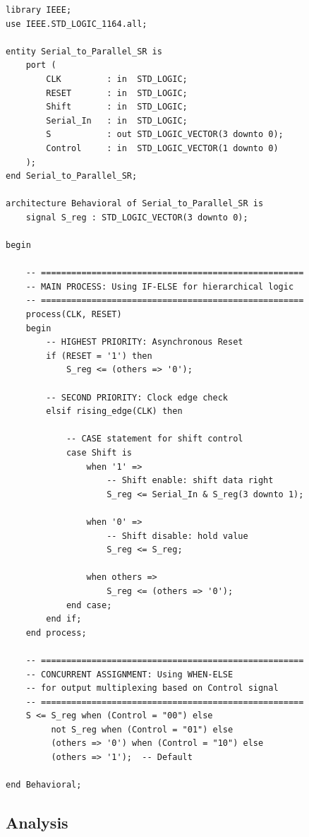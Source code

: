 \documentclass[12pt,a4paper]{article}
\begin{document}
\begin{lstlisting}
library IEEE;
use IEEE.STD_LOGIC_1164.all;

entity Serial_to_Parallel_SR is
    port (
        CLK         : in  STD_LOGIC;
        RESET       : in  STD_LOGIC;
        Shift       : in  STD_LOGIC;
        Serial_In   : in  STD_LOGIC;
        S           : out STD_LOGIC_VECTOR(3 downto 0);
        Control     : in  STD_LOGIC_VECTOR(1 downto 0)
    );
end Serial_to_Parallel_SR;

architecture Behavioral of Serial_to_Parallel_SR is
    signal S_reg : STD_LOGIC_VECTOR(3 downto 0);
    
begin
    
    -- ====================================================
    -- MAIN PROCESS: Using IF-ELSE for hierarchical logic
    -- ====================================================
    process(CLK, RESET)
    begin
        -- HIGHEST PRIORITY: Asynchronous Reset
        if (RESET = '1') then
            S_reg <= (others => '0');
        
        -- SECOND PRIORITY: Clock edge check
        elsif rising_edge(CLK) then
            
            -- CASE statement for shift control
            case Shift is
                when '1' =>
                    -- Shift enable: shift data right
                    S_reg <= Serial_In & S_reg(3 downto 1);
                
                when '0' =>
                    -- Shift disable: hold value
                    S_reg <= S_reg;
                
                when others =>
                    S_reg <= (others => '0');
            end case;
        end if;
    end process;
    
    -- ====================================================
    -- CONCURRENT ASSIGNMENT: Using WHEN-ELSE
    -- for output multiplexing based on Control signal
    -- ====================================================
    S <= S_reg when (Control = "00") else
         not S_reg when (Control = "01") else
         (others => '0') when (Control = "10") else
         (others => '1');  -- Default
    
end Behavioral;
\end{lstlisting}

\subsection{Analysis}
\end{document}
